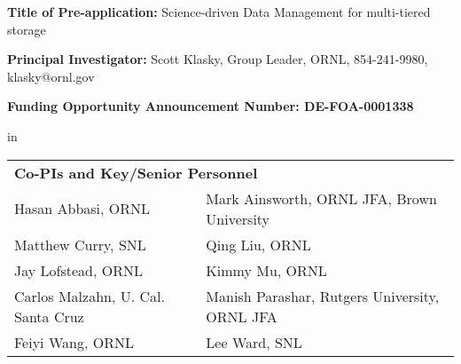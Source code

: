 \documentclass[11pt,letterpaper]{article}
\begin{document}










\setlength{\parindent}{0cm} 
{\bf Title of Pre-application:}  Science-driven Data Management for multi-tiered storage\par
{\bf Principal Investigator:} Scott Klasky, Group Leader, ORNL, 854-241-9980, klasky@ornl.gov \par
{\bf Funding Opportunity Announcement Number: DE-FOA-0001338} \par
  in
\hskip -0.08in
\begin{tabular} {ll}
 \multicolumn{2}{l}{\bf Co-PIs and Key/Senior Personnel}\\
Hasan Abbasi, ORNL  & Mark Ainsworth, ORNL JFA, Brown University \\
Matthew Curry, SNL & Qing  Liu, ORNL \\
Jay Lofstead, ORNL & Kimmy Mu, ORNL \\
Carlos Malzahn, U. Cal. Santa Cruz & Manish Parashar, Rutgers University, ORNL JFA \\
Feiyi Wang, ORNL & Lee Ward, SNL
\end{tabular}
\end{document}
